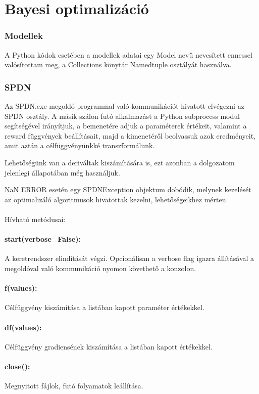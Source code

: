 \section{Bayesi optimalizáció}

\subsubsection{Modellek}
A Python kódok esetében a modellek adatai egy Model nevű nevesített ennessel valósítottam meg, a Collections könytár Namedtuple osztályát használva.

\subsubsection{SPDN}
Az SPDN.exe megoldó programmal való kommunikációt hivatott elvégezni az SPDN osztály. A másik szálon futó alkalmazást a Python subprocess modul segítségével irányítjuk, a bemenetére adjuk a paraméterek értékeit, valamint a reward függvények beállításait, majd a kimenetéről beolvassuk azok eredményeit, amit aztán a célfüggvényünkké transzformálunk.

Lehetőségünk van a deriváltak kiszámítására is, ezt azonban a dolgozatom jelenlegi állapotában még használjuk.

NaN ERROR esetén egy SPDNException objektum dobódik, melynek kezelését az optimalizáló algoritmusok hivatottak kezelni, lehetőségeikhez mérten.
\\\\Hívható metódusai:
\paragraph{start(verbose=False):} A keretrendszer elindítását végzi. Opcionálisan a verbose flag igazra állításával a megoldóval való kommunikáció nyomon követhető a konzolon.
\paragraph{f(values):} Célfüggvény kiszámítása a listában kapott paraméter értékekkel.
\paragraph{df(values):} Célfüggvény gradiensének kiszámítása a listában kapott értékekkel.
\paragraph{close():} Megnyitott fájlok, futó folyamatok leállítása.

